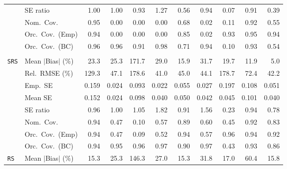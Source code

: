 \begin{landscape}
\begin{longtable}{llrrrrrrrrr}
 & SE ratio & \cellcolor{rankone}1.00 & \cellcolor{rankone}1.00 & \cellcolor{rankthree}0.93 & 1.27 & 0.56 & \cellcolor{ranktwo}0.94 & 0.07 & 0.91 & 0.39 \\
 & Nom.\ Cov. & \cellcolor{rankone}0.95 & 0.00 & 0.00 & 0.00 & \cellcolor{rankthree}0.68 & 0.02 & 0.11 & \cellcolor{ranktwo}0.92 & 0.55 \\
 & Orc.\ Cov.\ (Emp) & \cellcolor{ranktwo}0.94 & 0.00 & 0.00 & 0.00 & 0.85 & 0.02 & \cellcolor{rankthree}0.93 & \cellcolor{rankone}0.95 & \cellcolor{ranktwo}0.94 \\
 & Orc.\ Cov.\ (BC) & \cellcolor{rankone}0.96 & \cellcolor{rankone}0.96 & 0.91 & \cellcolor{rankthree}0.98 & 0.71 & \cellcolor{rankone}0.94 & 0.10 & \cellcolor{ranktwo}0.93 & 0.54 \\
\addlinespace[2pt]
\multicolumn{11}{l}{\textbf{Continuous Phase-One Covariates}} \\
\addlinespace[2pt]
\quad \texttt{SRS} & Mean $|$Bias$|$ (\%) & 23.3 & 25.3 & 171.7 & 29.0 & \cellcolor{rankthree}15.9 & 31.7 & 19.7 & \cellcolor{ranktwo}11.9 & \cellcolor{rankone}5.0 \\
 & Rel.\ RMSE (\%) & 129.3 & 47.1 & 178.6 & \cellcolor{rankone}41.0 & 45.0 & \cellcolor{rankthree}44.1 & 178.7 & 72.4 & \cellcolor{ranktwo}42.2 \\
 & Emp.\ SE & 0.159 & 0.024 & 0.093 & 0.022 & 0.055 & 0.027 & 0.197 & 0.108 & 0.051 \\
 & Mean SE & 0.152 & 0.024 & 0.098 & 0.040 & 0.050 & 0.042 & 0.045 & 0.101 & 0.040 \\
 & SE ratio & \cellcolor{ranktwo}0.96 & \cellcolor{rankone}1.00 & \cellcolor{rankthree}1.05 & 1.82 & 0.91 & 1.56 & 0.23 & 0.94 & 0.78 \\
 & Nom.\ Cov. & \cellcolor{rankone}0.94 & 0.47 & 0.10 & 0.57 & \cellcolor{rankthree}0.89 & 0.60 & 0.45 & \cellcolor{ranktwo}0.92 & 0.83 \\
 & Orc.\ Cov.\ (Emp) & \cellcolor{rankone}0.94 & 0.47 & 0.09 & 0.52 & \cellcolor{rankone}0.94 & \cellcolor{rankthree}0.57 & \cellcolor{rankone}0.96 & \cellcolor{rankone}0.94 & \cellcolor{ranktwo}0.92 \\
 & Orc.\ Cov.\ (BC) & \cellcolor{rankone}0.94 & \cellcolor{rankone}0.95 & \cellcolor{rankone}0.96 & \cellcolor{ranktwo}0.97 & 0.90 & \cellcolor{rankthree}0.97 & 0.43 & \cellcolor{ranktwo}0.93 & 0.86 \\
\addlinespace[2pt]
\quad \texttt{RS} & Mean $|$Bias$|$ (\%) & \cellcolor{rankone}15.3 & 25.3 & 146.3 & 27.0 & \cellcolor{rankone}15.3 & 31.8 & \cellcolor{rankthree}17.0 & 60.4 & \cellcolor{ranktwo}15.8 \\

\end{longtable}
\end{landscape}
